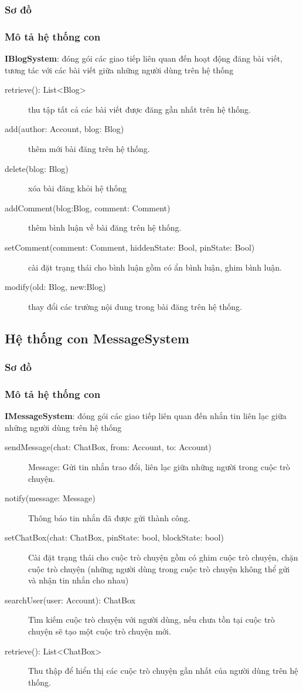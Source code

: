 \documentclass[./../main_file.tex]{subfiles}
\begin{document}
		\subsubsection{Sơ đồ}
		\subsubsection{Mô tả hệ thống con}
		\textbf{IBlogSystem}: đóng gói các giao tiếp liên quan đến hoạt động đăng bài viết, tương tác với các bài viết giữa những người dùng trên hệ thống
		\begin{description}
			\item[retrieve(): List<Blog>] thu tập tất cả các bài viết được đăng gần nhất trên hệ thống.
			\item[add(author: Account, blog: Blog)] thêm mới bài đăng trên hệ thống.
			\item[delete(blog: Blog)] xóa bài đăng khỏi hệ thống
			\item[addComment(blog:Blog, comment: Comment)] thêm bình luận về bài đăng trên hệ thống.
			\item[setComment(comment: Comment, hiddenState: Bool, pinState: Bool)] cài đặt trạng thái cho bình luận gồm có ẩn bình luận, ghim bình luận.
			\item[modify(old: Blog, new:Blog)] thay đổi các trường nội dung trong bài đăng trên hệ thống.
		\end{description}
		
	\subsection{Hệ thống con MessageSystem}
		\subsubsection{Sơ đồ}
		\subsubsection{Mô tả hệ thống con}
		\textbf{IMessageSystem}: đóng gói các giao tiếp liên quan đến nhắn tin liên lạc giữa những người dùng trên hệ thống
		\begin{description}
			\item[sendMessage(chat: ChatBox, from: Account, to: Account)] Message: Gửi tin nhắn trao đổi, liên lạc giữa những người trong cuộc trò chuyện.
			\item[notify(message: Message)] Thông báo tin nhắn đã được gửi thành công.
			\item[setChatBox(chat: ChatBox, pinState: bool, blockState: bool)] Cài đặt trạng thái cho cuộc trò chuyện gồm có ghim cuộc trò chuyện, chặn cuộc trò chuyện (những người dùng trong cuộc trò chuyện không thể gửi và nhận tin nhắn cho nhau)
			\item[searchUser(user: Account): ChatBox] Tìm kiếm cuộc trò chuyện với người dùng, nếu chưa tồn tại cuộc trò chuyện sẽ tạo một cuộc trò chuyện mới.
			\item[retrieve(): List<ChatBox>] Thu thập để hiển thị các cuộc trò chuyện gần nhất của người dùng trên hệ thống.
		\end{description}
\end{document}
